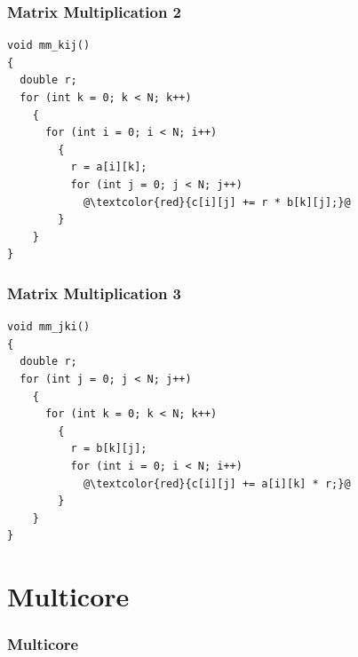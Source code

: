 \documentclass{beamer}
\begin{document}
\begin{frame}[fragile]
\frametitle{Matrix Multiplication 2}
\scriptsize

\begin{lstlisting}
void mm_kij()
{
  double r;
  for (int k = 0; k < N; k++)
    {
      for (int i = 0; i < N; i++)
        {
          r = a[i][k];
          for (int j = 0; j < N; j++)
            @\textcolor{red}{c[i][j] += r * b[k][j];}@
        }
    }
}
\end{lstlisting}

\end{frame}

\begin{frame}[fragile]
\frametitle{Matrix Multiplication 3}
\scriptsize

\begin{lstlisting}
void mm_jki()
{
  double r;
  for (int j = 0; j < N; j++)
    {
      for (int k = 0; k < N; k++)
        {
          r = b[k][j];
          for (int i = 0; i < N; i++)
            @\textcolor{red}{c[i][j] += a[i][k] * r;}@
        }
    }
}
\end{lstlisting}

\end{frame}

\section{Multicore}

\begin{frame}%
\frametitle{Multicore}

\end{frame}
\end{document}
